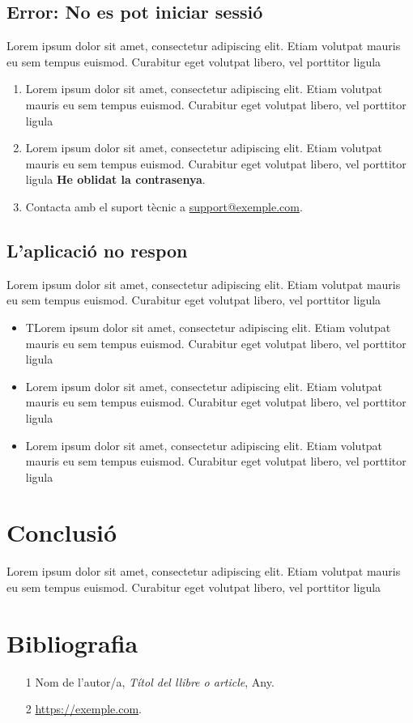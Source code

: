\documentclass[a4paper,12pt]{article}
\begin{document}
\subsection{Error: No es pot iniciar sessió}
Lorem ipsum dolor sit amet, consectetur adipiscing elit. Etiam volutpat mauris eu sem tempus euismod. Curabitur eget volutpat libero, vel porttitor ligula
\begin{enumerate}
    \item Lorem ipsum dolor sit amet, consectetur adipiscing elit. Etiam volutpat mauris eu sem tempus euismod. Curabitur eget volutpat libero, vel porttitor ligula
    \item Lorem ipsum dolor sit amet, consectetur adipiscing elit. Etiam volutpat mauris eu sem tempus euismod. Curabitur eget volutpat libero, vel porttitor ligula \textbf{He oblidat la contrasenya}.
    \item Contacta amb el suport tècnic a \href{mailto:support@exemple.com}{support@exemple.com}.
\end{enumerate}

\subsection{L'aplicació no respon}
Lorem ipsum dolor sit amet, consectetur adipiscing elit. Etiam volutpat mauris eu sem tempus euismod. Curabitur eget volutpat libero, vel porttitor ligula
\begin{itemize}
    \item TLorem ipsum dolor sit amet, consectetur adipiscing elit. Etiam volutpat mauris eu sem tempus euismod. Curabitur eget volutpat libero, vel porttitor ligula
    \item Lorem ipsum dolor sit amet, consectetur adipiscing elit. Etiam volutpat mauris eu sem tempus euismod. Curabitur eget volutpat libero, vel porttitor ligula
    \item Lorem ipsum dolor sit amet, consectetur adipiscing elit. Etiam volutpat mauris eu sem tempus euismod. Curabitur eget volutpat libero, vel porttitor ligula
\end{itemize}

\section{Conclusió}
Lorem ipsum dolor sit amet, consectetur adipiscing elit. Etiam volutpat mauris eu sem tempus euismod. Curabitur eget volutpat libero, vel porttitor ligula

\section*{Bibliografia}
\begin{itemize}
    \item [1] Nom de l’autor/a, \textit{Títol del llibre o article}, Any.
    \item [2] \url{https://exemple.com}.
\end{itemize}
\end{document}
